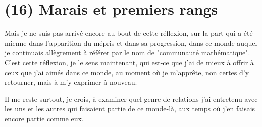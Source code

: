 \section{(16) Marais et premiers rangs}

Mais je ne suis pas arrivé encore au bout de cette réflexion, sur la part qui a été mienne dans l'apparition du mépris et dans sa progression, dans ce monde auquel je continuais allègrement à référer par le nom de "communauté mathématique". C'est cette réflexion, je le sens maintenant, qui est-ce que j'ai de mieux à offrir à ceux que j'ai aimés dans ce monde, au moment où je m'apprête, non certes d'y retourner, mais à m'y exprimer à nouveau.

Il me reste surtout, je crois, à examiner quel genre de relations j'ai entretenu avec les uns et les autres qui faisaient partie de ce monde-là, aux temps où j'en faisais encore partie comme eux.

